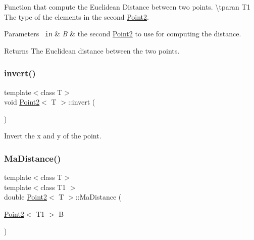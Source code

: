 Function that compute the Euclidean Distance between two points. \textbackslash{}tparan T1 The type of the elements in the second {\ttfamily \mbox{\hyperlink{class_point2}{Point2}}}. 


\begin{DoxyParams}[1]{Parameters}
\mbox{\texttt{ in}}  & {\em B} & the second {\ttfamily \mbox{\hyperlink{class_point2}{Point2}}} to use for computing the distance. \\
\hline
\end{DoxyParams}
\begin{DoxyReturn}{Returns}
The Euclidean distance between the two points. 
\end{DoxyReturn}
\mbox{\label{class_point2_aabc6ec4c0ed4c7757ac61a9448195c97}} 
\subsubsection{\texorpdfstring{invert()}{invert()}}
{\footnotesize\ttfamily template$<$class T$>$ \\
void \mbox{\hyperlink{class_point2}{Point2}}$<$ T $>$\+::invert (\begin{DoxyParamCaption}{ }\end{DoxyParamCaption})\hspace{0.3cm}{\ttfamily [inline]}}



Invert the x and y of the point. 

\mbox{\label{class_point2_a10a4aa3d7939b1675f4bd18b8f9f0ead}} 
\subsubsection{\texorpdfstring{MaDistance()}{MaDistance()}}
{\footnotesize\ttfamily template$<$class T$>$ \\
template$<$class T1 $>$ \\
double \mbox{\hyperlink{class_point2}{Point2}}$<$ T $>$\+::Ma\+Distance (\begin{DoxyParamCaption}\item[{\mbox{\hyperlink{class_point2}{Point2}}$<$ T1 $>$}]{B }\end{DoxyParamCaption})\hspace{0.3cm}{\ttfamily [inline]}}



